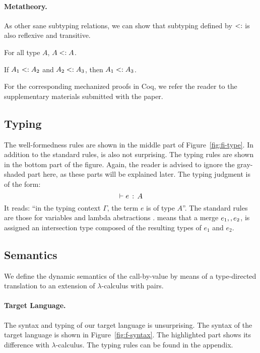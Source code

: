 \paragraph{Metatheory.} As other sane subtyping relations, we can show that
subtyping defined by $<:$ is also reflexive and transitive.

\begin{lemma} \label{lemma:sub-refl}
  For all type $ A $, $ A <: A $.
\end{lemma}

\begin{lemma} \label{lemma:sub-trans}
  If $ A_1 <: A_2 $ and $ A_2 <: A_3 $,
  then $ A_1 <: A_3 $.
\end{lemma}

For the corresponding mechanized proofs in Coq, we refer the reader to the
supplementary materials submitted with the paper.

\subsection{Typing}

The well-formedness rules are shown in the middle part of
Figure~\ref{fig:fi-type}. In addition to the standard rules,
 is also not surprising. The typing rules are shown in
the bottom part of the figure. Again, the reader is advised to ignore the
gray-shaded part here, as these parts will be explained later. The typing judgment is
of the form: \[ \vdash e \ \!:\! \ A \] It reads: ``in the typing context $\Gamma$,
the term $e$ is of type $A$''. The standard rules are
those for variables  and lambda abstractions
.
 means that a merge $e_1 ,, e_2$,
is assigned an intersection type composed of the resulting types of
$e_1$ and $e_2$.

\subsection{Semantics}

We define the dynamic semantics of the call-by-value \name by means of
a type-directed translation to an extension of $\lambda$-calculus with pairs.


\paragraph{Target Language.}
The syntax and typing of our target language is unsurprising. The syntax of the
target language is shown in Figure~\ref{fig:f-syntax}. The highlighted part
shows its difference with $\lambda$-calculus. The typing rules can be found
in the appendix.

